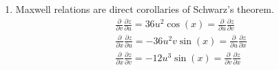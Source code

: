\begin{@empty}
\begin{answer}
\begin{enumerate}
        \item Maxwell relations are direct corollaries of Schwarz's theorem.
            \[
                \begin{gathered}
                    \frac\partial{\partial v}\frac{\partial z}{\partial u}
                        = 36 u^2 \cos(x)
                        = \frac\partial{\partial u}\frac{\partial z}{\partial v} \\
                    \frac\partial{\partial x}\frac{\partial z}{\partial u}
                        = -36 u^2 v \sin(x)
                        = \frac\partial{\partial u}\frac{\partial z}{\partial x} \\
                    \frac\partial{\partial x}\frac{\partial z}{\partial v}
                        = -12 u^3 \sin(x)
                        = \frac\partial{\partial v}\frac{\partial z}{\partial x} \\
                \end{gathered}
            \]
    \end{enumerate}
\end{answer}

\begin{problem}
\end{problem}
\end{@empty}
